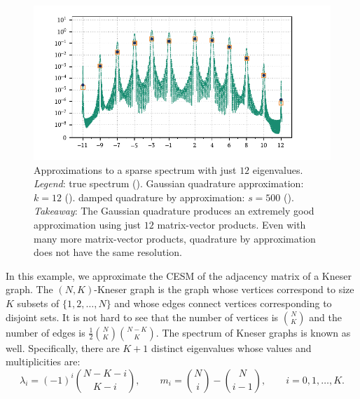 \begin{figure}[htb]
    \includegraphics[width=\textwidth]{imgs/ch4_Kneser_smoothed.pdf}
    \caption[{Approximations to a sparse spectrum with just \( 12 \) eigenvalues.}]{%
    Approximations to a sparse spectrum with just \( 12 \) eigenvalues.
    \hspace{.25em}\emph{Legend}:
    true spectrum  
    ({\protect{}}).
    Gaussian quadrature approximation: \( k=12 \)
    ({\protect{}}).
    damped quadrature by approximation: \( s=500 \)
    ({\protect{}}).
    \hspace{.25em}\emph{Takeaway}: The Gaussian quadrature produces an extremely good approximation using just \( 12 \) matrix-vector products.
    Even with many more matrix-vector products, quadrature by approximation does not have the same resolution. 
    }
    \label{fig:Kneser}
\end{figure}


In this example, we approximate the CESM of the adjacency matrix of a Kneser graph.
The \( (N,K) \)-Kneser graph is the graph whose vertices correspond to size \( K \) subsets of \( \{1, 2, \ldots, N\} \) and whose edges connect vertices corresponding to disjoint sets.
It is not hard to see that the number of vertices is \( \binom{N}{K} \) and the number of edges is \( \frac{1}{2}\binom{N}{K}\binom{N-K}{K} \).
The spectrum of Kneser graphs is known as well. 
Specifically, there are \( K+1 \) distinct eigenvalues whose values and multiplicities are:
\begin{equation*}
    \lambda_i = (-1)^i\binom{N-K-i}{K-i}
    ,\qquad
    m_i = \binom{N}{i} - \binom{N}{i-1}
    ,\qquad 
    i=0,1,\ldots, K.
\end{equation*}

